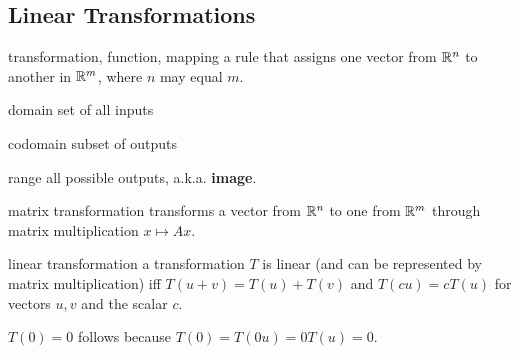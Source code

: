 \begin{card}
    \subsection{Linear Transformations}

    \begin{compactdesc}
    \item[transformation, function, mapping] a rule that assigns one
        vector from $\mathbb{R}^n$ to another in $\mathbb{R}^m$, where $n$ may equal $m$.
    \item[domain] set of all inputs
    \item[codomain] subset of outputs
    \item[range] all possible outputs,
        a.k.a. \textbf{image}.
    \item[matrix transformation] transforms a vector from $\mathbb{R}^n$ to one from
        $\mathbb{R}^m$ through matrix multiplication $x \mapsto Ax$.
    \item[linear transformation] a transformation $T$ is linear (and can be
        represented by matrix multiplication) iff $T(u + v) = T(u) + T(v)$
        and $T(cu) = cT(u)$ for vectors $u, v$ and the scalar $c$.
    \item[$T(0) = 0$ follows] because $T(0) = T(0u) = 0T(u) = 0$.
    \end{compactdesc}
\end{card}



